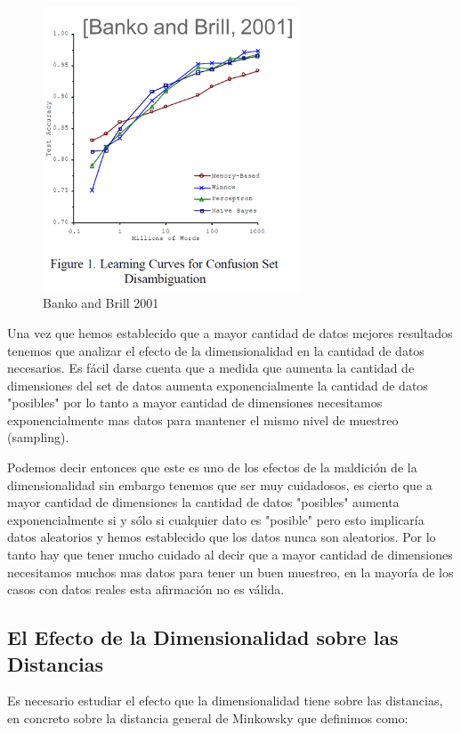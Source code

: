 \begin{figure}[!htb]
\centering
\includegraphics[width=3in]{figures/banko-brill-fig.png}
\caption{Banko and Brill 2001}

\end{figure}

Una vez que hemos establecido que a mayor cantidad de datos mejores resultados tenemos que analizar el efecto de la dimensionalidad en la cantidad de datos necesarios. Es fácil darse cuenta que a medida que aumenta la cantidad de dimensiones del set de datos aumenta exponencialmente la cantidad de datos "posibles" por lo tanto a mayor cantidad de dimensiones necesitamos exponencialmente mas datos para mantener el mismo nivel de muestreo (sampling). 

Podemos decir entonces que este es uno de los efectos de la maldición de la dimensionalidad sin embargo tenemos que ser muy cuidadosos, es cierto que a mayor cantidad de dimensiones la cantidad de datos "posibles" aumenta exponencialmente si y sólo si cualquier dato es "posible" pero esto implicaría datos aleatorios y hemos establecido que los datos nunca son aleatorios. Por lo tanto hay que tener mucho cuidado al decir que a mayor cantidad de dimensiones necesitamos muchos mas datos para tener un buen muestreo, en la mayoría de los casos con datos reales esta afirmación no es válida.

\subsection{El Efecto de la Dimensionalidad sobre las Distancias}
Es necesario estudiar el efecto que la dimensionalidad tiene sobre las distancias, en concreto sobre la distancia general de Minkowsky que definimos como:

